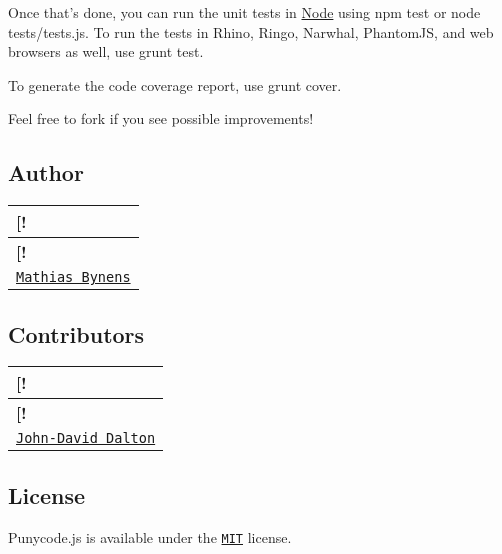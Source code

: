 Once that’s done, you can run the unit tests in \mbox{\hyperlink{classNode}{Node}} using {\ttfamily npm test} or {\ttfamily node tests/tests.\+js}. To run the tests in Rhino, Ringo, Narwhal, Phantom\+JS, and web browsers as well, use {\ttfamily grunt test}.

To generate the code coverage report, use {\ttfamily grunt cover}.

Feel free to fork if you see possible improvements!

\subsection*{Author}

\tabulinesep=1mm
\begin{longtabu} spread 0pt [c]{*{1}{|X[-1]}|}
\hline
\rowcolor{\tableheadbgcolor}\textbf{ \mbox{[}!   }\\
\endfirsthead
\hline
\endfoot
\hline
\rowcolor{\tableheadbgcolor}\textbf{ \mbox{[}!   }\\
\endhead
\href{https://mathiasbynens.be/}{\tt Mathias Bynens}   \\
\end{longtabu}


\subsection*{Contributors}

\tabulinesep=1mm
\begin{longtabu} spread 0pt [c]{*{1}{|X[-1]}|}
\hline
\rowcolor{\tableheadbgcolor}\textbf{ \mbox{[}!   }\\
\endfirsthead
\hline
\endfoot
\hline
\rowcolor{\tableheadbgcolor}\textbf{ \mbox{[}!   }\\
\endhead
\href{http://allyoucanleet.com/}{\tt John-\/\+David Dalton}   \\
\end{longtabu}


\subsection*{License}

Punycode.\+js is available under the \href{https://mths.be/mit}{\tt M\+IT} license. 